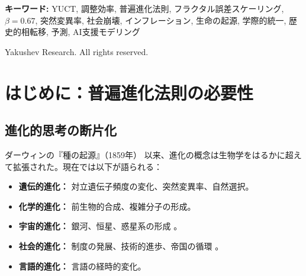 \documentclass[12pt,a4paper]{article}
\theoremstyle{remark}
\begin{document}
\begin{titlepage}
\begin{center}
\begin{minipage}{0.9\textwidth}
\begin{abstract}
					\noindent
					\textbf{このバージョンの新規性:} 我々はこの枠組みをメタレベルに拡張し、文明自体の進化に適用する。蓄積された知識 \(Z(t)\) と \(K_{\text{eff}}\) との結合をモデル化することにより、主要な調整ブレークスルー（文字、宗教、印刷、科学など）に対応する一連の歴史的相転移を同定する。YUCT から直接導出される自己加速（双曲線的）成長モデルは、歴史の加速的ペースを説明する。このモデルを用いて次の主要相転移を予測する。崩壊対特異点の分岐を厳密に分析した結果、数学的に一貫した唯一の帰結は特異点——すなわち全球的調整の質的飛躍——であり、それは 2049–2055 年頃に予想される。この数学的枠組みは、すべての分野にわたる進化に統一言語を提供し、進化を記述的科学から予測的科学へと変革する。
				\end{abstract}
			\end{minipage}
			
			\vspace{1cm}
			
			\noindent
			\small\textbf{キーワード:} YUCT, 調整効率, 普遍進化法則, フラクタル誤差スケーリング, \(\beta=0.67\), 突然変異率, 社会崩壊, インフレーション, 生命の起源, 学際的統一, 歴史的相転移, 予測, AI支援モデリング
			
			\vspace{0.5cm}
			
			\noindent
			 Yakushev Research. All rights reserved.
		\end{center}
	\end{titlepage}
	
	\tableofcontents
	\newpage
	
	\section{はじめに：普遍進化法則の必要性}
	
	\subsection{進化的思考の断片化}
	
	ダーウィンの『種の起源』（1859年）\cite{Darwin1859} 以来、進化の概念は生物学をはるかに超えて拡張された。現在では以下が語られる：
	
	\begin{itemize}
		\item \textbf{遺伝的進化：} 対立遺伝子頻度の変化、突然変異率、自然選択。
		\item \textbf{化学的進化：} 前生物的合成、複雑分子の形成。
		\item \textbf{宇宙的進化：} 銀河、恒星、惑星系の形成 \cite{Chaisson2001}。
		\item \textbf{社会的進化：} 制度の発展、技術的進歩、帝国の循環 \cite{Boulding1978}。
		\item \textbf{言語的進化：} 言語の経時的変化。
	\end{itemize}
	
\end{document}

